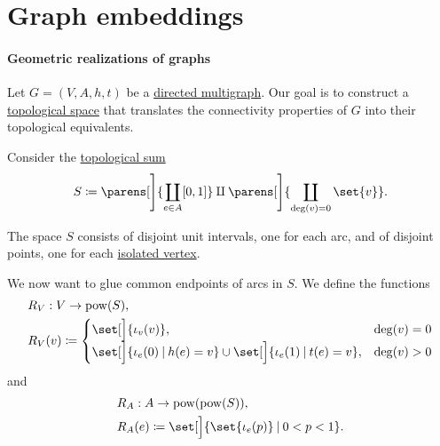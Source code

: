 \section{Graph embeddings}\label{sec:graph_embeddings}

\paragraph{Geometric realizations of graphs}

\begin{definition}\label{def:graph_geometric_realization}\mimprovised
  Let \( G = (V, A, h, t) \) be a \hyperref[def:directed_multigraph]{directed multigraph}. Our goal is to construct a \hyperref[def:topological_space]{topological space} that translates the connectivity properties of \( G \) into their topological equivalents.

  Consider the \hyperref[def:topological_sum]{topological sum}
  \begin{equation*}
    S \coloneqq \parens[\Bigg]{ \coprod_{e \in A} [0, 1] } \amalg \parens[\Bigg]{ \coprod_{\deg(v) = 0} \set{ v } }.
  \end{equation*}

  The space \( S \) consists of disjoint unit intervals, one for each arc, and of disjoint points, one for each \hyperref[def:graph_cardinality/directed_degree]{isolated vertex}.

  We now want to glue common endpoints of arcs in \( S \). We define the functions
  \begin{equation}\label{eq:def:graph_geometric_realization/rv}
    \begin{aligned}
      &R_V: V \to \pow(S), \\
      &R_V(v) \coloneqq \begin{cases}
        \set[\Big]{ \iota_v(v) },                                                               &\deg(v) = 0 \\
        \set[\Big]{ \iota_e(0) \given h(e) = v } \cup \set[\Big]{ \iota_e(1) \given t(e) = v }, &\deg(v) > 0
      \end{cases}
    \end{aligned}
  \end{equation}
  and
  \begin{equation}\label{eq:def:graph_geometric_realization/ra}
    \begin{aligned}
      &R_A: A \to \pow(\pow(S)), \\
      &R_A(e) \coloneqq \set[\Big]{ \set{ \iota_e(p) } \given 0 < p < 1 }.
    \end{aligned}
  \end{equation}


\end{definition}
